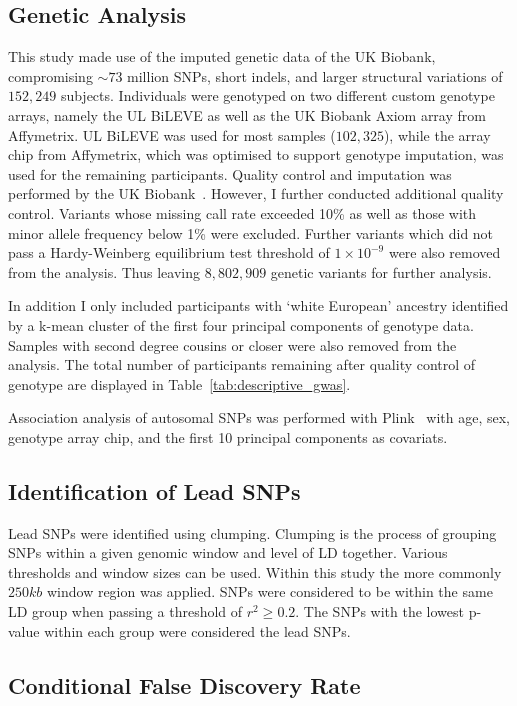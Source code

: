 \subsection{Genetic Analysis}
\label{sub:genetic_analysis_assoc}
This study made use of the imputed genetic data of the UK Biobank, compromising $\sim73$ million SNPs, short indels, and larger structural variations of $152,249$ subjects.
Individuals were genotyped on two different custom genotype arrays, namely the UL BiLEVE as well as the UK Biobank Axiom array from Affymetrix. 
UL BiLEVE was used for most samples ($102,325$), while the array chip from Affymetrix, which was optimised to support genotype imputation, was used for the remaining participants. 
Quality control and imputation was performed by the UK Biobank~\cite{Marchini2015}.
However, I further conducted additional quality control.
Variants whose missing call rate exceeded 10\% as well as those with minor allele frequency below 1\% were excluded.
Further variants which did not pass a Hardy-Weinberg equilibrium test threshold of $1\times10^{-9}$ were also removed from the analysis.
Thus leaving $8,802,909$ genetic variants for further analysis.

In addition I only included participants with `white European' ancestry identified by a k-mean cluster of the first four principal components of genotype data.
Samples with second degree cousins or closer were also removed from the analysis.
The total number of participants remaining after quality control of genotype are displayed in Table~\ref{tab:descriptive_gwas}.

Association analysis of autosomal SNPs was performed with Plink~\cite{Purcell2007,Chang2015} with age, sex, genotype array chip, and the first 10 principal components as covariats.

\subsection{Identification of Lead SNPs}
\label{sub:Clumping}

Lead SNPs were identified using clumping.
Clumping is the process of grouping SNPs within a given genomic window and level of LD together.
Various thresholds and window sizes can be used.
Within this study the more commonly $250kb$ window region was applied.
SNPs were considered to be within the same LD group when passing a threshold of $r^2 \ge 0.2$.
The SNPs with the lowest p-value within each group were considered the lead SNPs.

\subsection{Conditional False Discovery Rate}
\label{sub:conditional_false_discovery_rate}


